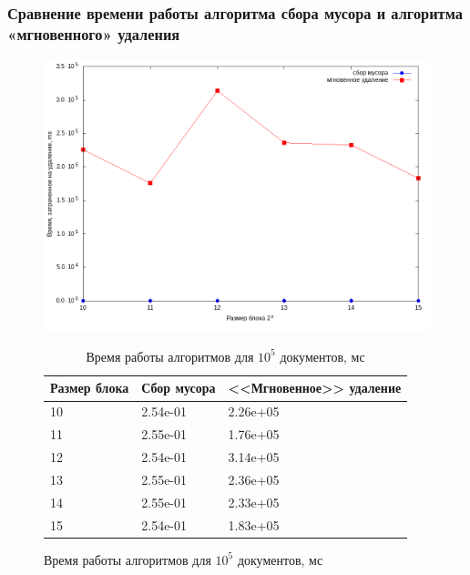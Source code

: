 \documentclass[aspectratio=169, pdf, 8pt, unicode]{beamer}
\begin{document}
\begin{frame}[fragile]
\frametitle{Сравнение времени работы алгоритма сбора мусора и алгоритма
«мгновенного» удаления}
\begin{figure}[H]
\centering
\begin{minipage}[h]{0.475\linewidth}
\includegraphics[width=1\textwidth]{fig/time_1e5.png}
\caption{Зависимость времени работы алгоритма от размера блока}
\end{minipage}
\hfil
\begin{minipage}[h]{0.35\linewidth}
\begin{table}[H]
      \caption{Время работы алгоритмов для
      $10^5$ документов, мс}
      \centering
      \small
      \singlespacing
      \begin{tabular}{|p{1.5cm}|p{1.5cm}|p{2cm}|}
            \hline
            Размер блока & Сбор мусора                & <<Мгновенное>> удаление \\ \hline \hline
            10           & 2.54e-01                   & 2.26e+05              \\ \hline
            11           & 2.55e-01                   & 1.76e+05              \\ \hline
            12           & 2.54e-01                   & 3.14e+05              \\ \hline
            13           & 2.55e-01                   & 2.36e+05              \\ \hline
            14           & 2.55e-01                   & 2.33e+05              \\ \hline
            15           & 2.54e-01                   & 1.83e+05              \\ \hline
\end{tabular}
\end{table}
\end{minipage}
\end{figure}
\end{frame}
\end{document}
